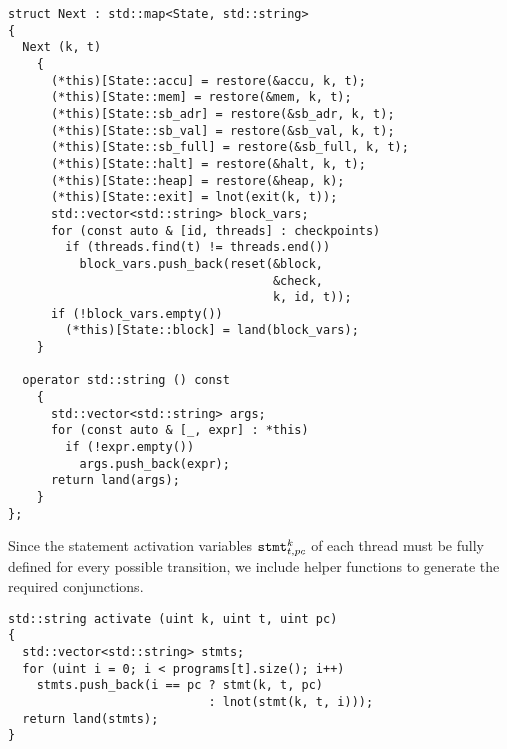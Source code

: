 \begin{lstlisting}[style=c++]
struct Next : std::map<State, std::string>
{
  Next (k, t)
    {
      (*this)[State::accu] = restore(&accu, k, t);
      (*this)[State::mem] = restore(&mem, k, t);
      (*this)[State::sb_adr] = restore(&sb_adr, k, t);
      (*this)[State::sb_val] = restore(&sb_val, k, t);
      (*this)[State::sb_full] = restore(&sb_full, k, t);
      (*this)[State::halt] = restore(&halt, k, t);
      (*this)[State::heap] = restore(&heap, k);
      (*this)[State::exit] = lnot(exit(k, t));
      std::vector<std::string> block_vars;
      for (const auto & [id, threads] : checkpoints)
        if (threads.find(t) != threads.end())
          block_vars.push_back(reset(&block,
                                     &check,
                                     k, id, t));
      if (!block_vars.empty())
        (*this)[State::block] = land(block_vars);
    }

  operator std::string () const
    {
      std::vector<std::string> args;
      for (const auto & [_, expr] : *this)
        if (!expr.empty())
          args.push_back(expr);
      return land(args);
    }
};
\end{lstlisting}


\newpage
\noindent
Since the statement activation variables $\texttt{stmt}^k_{t, pc}$ of each thread must be fully defined for every possible transition, we include helper functions to generate the required conjunctions.

\begin{lstlisting}[style=c++]
std::string activate (uint k, uint t, uint pc)
{
  std::vector<std::string> stmts;
  for (uint i = 0; i < programs[t].size(); i++)
    stmts.push_back(i == pc ? stmt(k, t, pc)
                            : lnot(stmt(k, t, i)));
  return land(stmts);
}
\end{lstlisting}

